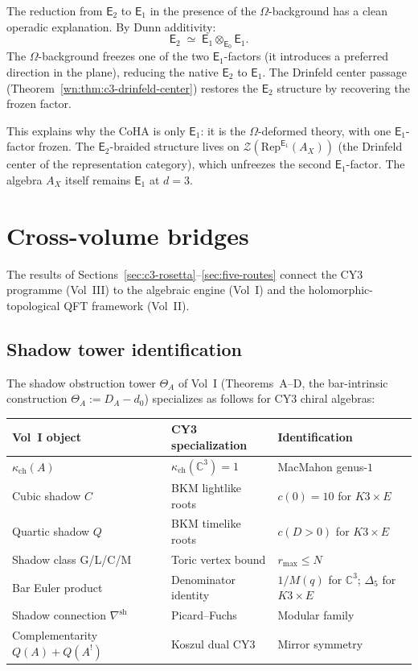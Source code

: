 \documentclass[11pt]{article}
\newcommand{\cZ}{\mathcal{Z}}
\newcommand{\C}{\mathbb{C}}
\newcommand{\Eone}{\mathsf{E}_1}
\newcommand{\Etwo}{\mathsf{E}_2}
\newcommand{\Rep}{\mathrm{Rep}}
\begin{document}
The reduction from $\Etwo$ to $\Eone$ in the presence of the $\Omega$-background has a clean operadic explanation. By Dunn additivity:
\[
 \Etwo \;\simeq\; \Eone \otimes_{\mathsf{E}_0} \Eone.
\]
The $\Omega$-background freezes one of the two $\Eone$-factors (it introduces a preferred direction in the plane), reducing the native $\Etwo$ to $\Eone$. The Drinfeld center passage (Theorem~\ref{wn:thm:c3-drinfeld-center}) restores the $\Etwo$ structure by recovering the frozen factor.

This explains why the CoHA is only $\Eone$: it is the $\Omega$-deformed theory, with one $\Eone$-factor frozen. The $\Etwo$-braided structure lives on $\cZ(\Rep^{\Eone}(A_X))$ (the Drinfeld center of the representation category), which unfreezes the second $\Eone$-factor. The algebra $A_X$ itself remains $\Eone$ at $d = 3$.


\section{Cross-volume bridges}
\label{wn:sec:cross-volume}

The results of Sections~\ref{sec:c3-rosetta}--\ref{sec:five-routes} connect the CY3 programme (Vol~III) to the algebraic engine (Vol~I) and the holomorphic-topological QFT framework (Vol~II).

\subsection{Shadow tower identification}
\label{wn:subsec:cross-vol-shadow}

The shadow obstruction tower $\Theta_A$ of Vol~I (Theorems~A--D, the bar-intrinsic construction $\Theta_A := D_A - d_0$) specializes as follows for CY3 chiral algebras:

\begin{center}
\renewcommand{\arraystretch}{1.3}
\begin{tabular}{lll}
 \toprule
 \textbf{Vol~I object} & \textbf{CY3 specialization} & \textbf{Identification} \\
 \midrule
 $\kappa_{\mathrm{ch}}(A)$ & $\kappa_{\mathrm{ch}}(\C^3) = 1$ & MacMahon genus-$1$ \\
 Cubic shadow $C$ & BKM lightlike roots & $c(0) = 10$ for $K3 \times E$ \\
 Quartic shadow $Q$ & BKM timelike roots & $c(D > 0)$ for $K3 \times E$ \\
 Shadow class G/L/C/M & Toric vertex bound & $r_{\max} \leq N$ \\
 Bar Euler product & Denominator identity & $1/M(q)$ for $\C^3$; $\Delta_5$ for $K3 \times E$ \\
 Shadow connection $\nabla^{\mathrm{sh}}$ & Picard--Fuchs & Modular family \\
 Complementarity $Q(A) + Q(A^!)$ & Koszul dual CY3 & Mirror symmetry \\
 \bottomrule
\end{tabular}
\end{center}
\end{document}
